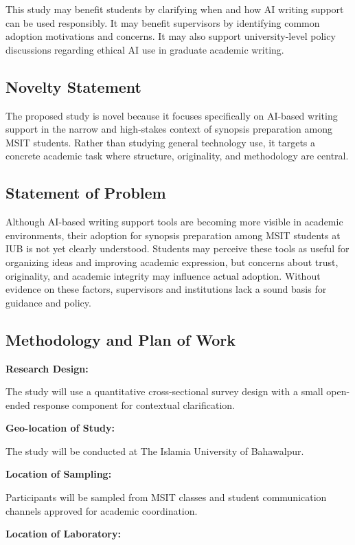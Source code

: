 \documentclass[11pt,a4paper]{article}
\begin{document}
This study may benefit students by clarifying when and how AI writing support can be used responsibly. It may benefit supervisors by identifying common adoption motivations and concerns. It may also support university-level policy discussions regarding ethical AI use in graduate academic writing.

\subsection{Novelty Statement}

The proposed study is novel because it focuses specifically on AI-based writing support in the narrow and high-stakes context of synopsis preparation among MSIT students. Rather than studying general technology use, it targets a concrete academic task where structure, originality, and methodology are central.

\subsection{Statement of Problem}

Although AI-based writing support tools are becoming more visible in academic environments, their adoption for synopsis preparation among MSIT students at IUB is not yet clearly understood. Students may perceive these tools as useful for organizing ideas and improving academic expression, but concerns about trust, originality, and academic integrity may influence actual adoption. Without evidence on these factors, supervisors and institutions lack a sound basis for guidance and policy.

\subsection{Methodology and Plan of Work}

\textbf{Research Design:}

The study will use a quantitative cross-sectional survey design with a small open-ended response component for contextual clarification.

\textbf{Geo-location of Study:}

The study will be conducted at The Islamia University of Bahawalpur.

\textbf{Location of Sampling:}

Participants will be sampled from MSIT classes and student communication channels approved for academic coordination.

\textbf{Location of Laboratory:}
\end{document}
